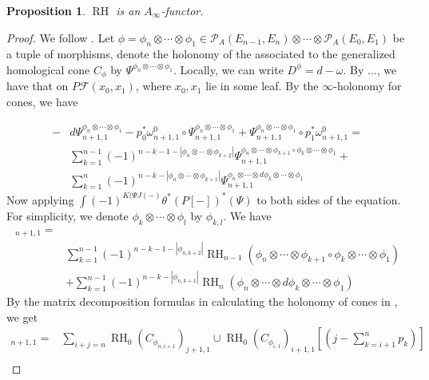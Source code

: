 \documentclass[12pt]{amsart}
\newtheorem{prop}[thm]{Proposition}
\theoremstyle{definition}
\theoremstyle{remark}
\numberwithin{equation}{section}
\newcommand{\CF}{{\mathcal F}}
\newcommand{\A}{{A}}
\newcommand{\1}{{\mathbb{1}}}
\newcommand{\RH}{\operatorname{RH}}
\begin{document}
\begin{prop}
$\RH$ is an $A_{\infty}$-functor.
\end{prop}
\begin{proof}
    We follow \cite[Theorem 4.2]{BS14}. Let $\phi = \phi_n\otimes \cdots \otimes \phi_1 \in \mathcal{P}_{\A}(E_{n-1}, E_n)\otimes\cdots \otimes \mathcal{P}_{\A}(E_{0}, E_1)$ be a tuple of morphisms, denote the holonomy of the associated to the generalized homological cone $C_{\phi}$ by $\Psi^{\phi_n\otimes \cdots \otimes \phi_1}$. Locally, we can write $D^{\phi} = d - \omega$. By ..., we have that on $P\CF(x_0, x_1)$, where $x_0, x_1$ lie in some leaf. By the $\infty$-holonomy for cones, we have
    
    \begin{align*}
        -& d\Psi^{\phi_n\otimes \cdots \otimes \phi_1}_{n+1, 1} - p_0^*\omega^0_{n+1, 1} \circ  \Psi^{\phi_n\otimes \cdots \otimes \phi_1}_{n+1, 1}  + \Psi^{\phi_n\otimes \cdots \otimes \phi_1}_{n+1, 1} \circ p_1^*\omega^0_{n+1, 1} =\\
        &\sum_{k=1}^{n-1}(-1)^{n - k - 1 - |\phi_n\otimes \cdots \otimes \phi_{k+2}|} \Psi^{\phi_n\otimes \cdots\otimes \phi_{k+1}\circ \phi_k\otimes \cdots \otimes \phi_1}_{n+1, 1} + \\
        &\sum_{k=1}^{n}(-1)^{n - k  - |\phi_n\otimes \cdots \otimes \phi_{k+1}|} \Psi^{\phi_n\otimes \cdots\otimes d\phi_k\otimes \cdots \otimes \phi_1}_{n+1, 1}
    \end{align*}
    Now applying $\int (-1)^{K(\Psi J(-)} \theta^*(P[-])^*(\Psi)$ to both sides of the equation. For simplicity, we denote $\phi_k\otimes \cdots \otimes \phi_l$ by $\phi_{k,l}$. We have
    \begin{align*}
        [& RH_0 (C_{\phi}) \cup RH_0(C_{\phi}) + \hat{\delta} \RH_0(C_{\phi})]_{n+1, 1} =\\
        &\sum_{k=1}^{n-1}(-1)^{n - k - 1 - |\phi_{n,k+2}|}\RH_{n-1}(\phi_n\otimes \cdots\otimes \phi_{k+1}\circ \phi_k\otimes \cdots \otimes \phi_1)\\
        &+ \sum_{k=1}^{n-1}(-1)^{n - k - |\phi_{n,k+1}|}\RH_{n}(\phi_n\otimes \cdots\otimes  d\phi_k\otimes \cdots \otimes \phi_1)
    \end{align*}
    By the matrix decomposition formulas in calculating the holonomy of cones in \cite[Section 3.5.2]{AS14}, we get 
    \begin{align*}
        [ RH_0 (C_{\phi}) \cup RH_0(C_{\phi})]_{n+1, 1} =& \sum_{i+j = n}\RH_0(C_{\phi_{n, i+1}})_{j+1, 1}\cup \RH_0(C_{\phi_{i, 1}})_{i+1, 1}[(j - \sum_{k = i+1}^n p_k)]\\

\end{align*}
\end{proof}
\end{document}
